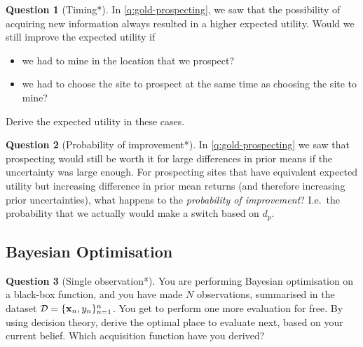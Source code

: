\documentclass[a4paper]{article}
\theoremstyle{definition}
\newtheorem{question}{Question}
\begin{document}
\begin{question}[Timing*]
\label{q:timing}
In \cref{q:gold-prospecting}, we saw that the possibility of acquiring new information always resulted in a higher expected utility. Would we still improve the expected utility if
\begin{itemize}
\item we had to mine in the location that we prospect?
\item we had to choose the site to prospect at the same time as choosing the site to mine?
\end{itemize}
Derive the expected utility in these cases.
\end{question}

\begin{question}[Probability of improvement*]
\label{q:prob-improv}
In \cref{q:gold-prospecting} we saw that prospecting would still be worth it for large differences in prior means if the uncertainty was large enough. For prospecting sites that have equivalent expected utility but increasing difference in prior mean returns (and therefore increasing prior uncertainties), what happens to the \emph{probability of improvement}? I.e.~the probability that we actually would make a switch based on $d_p$.
\end{question}


\subsection{Bayesian Optimisation}
\begin{question}[Single observation*]
\label{q:single-obs-bo}
You are performing Bayesian optimisation on a black-box function, and you have made $N$ observations, summarised in the dataset $\mathcal{D} = \{\mathbf{x}_n, y_n\}_{n=1}^n$. You get to perform one more evaluation for free. By using decision theory, derive the optimal place to evaluate next, based on your current belief. Which acquisition function have you derived?
\end{question}
\end{document}
